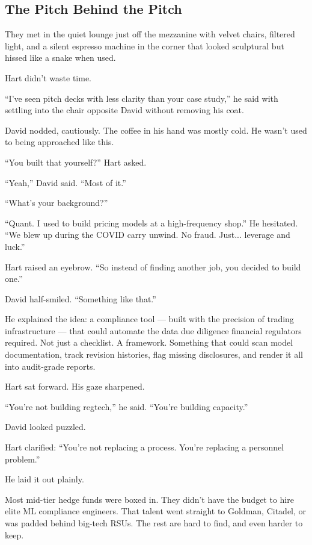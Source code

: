 
\subsection{The Pitch Behind the Pitch}

They met in the quiet lounge just off the mezzanine with
velvet chairs, filtered light, and a silent espresso machine in the corner that looked sculptural but hissed like a 
snake when used. 

Hart didn’t waste time.

``I’ve seen pitch decks with less clarity than your case study,'' he said with settling into the chair opposite David 
without removing his coat.

David nodded, cautiously. The coffee in his hand was mostly cold. He wasn’t used to being approached like this.

``You built that yourself?'' Hart asked.

``Yeah,'' David said. ``Most of it.''

``What’s your background?''

``Quant. I used to build pricing models at a high-frequency shop.'' 
He hesitated. ``We blew up during the COVID carry unwind. No fraud. Just... leverage and luck.''

Hart raised an eyebrow. ``So instead of finding another job, you decided to build one.''

David half-smiled. ``Something like that.''

He explained the idea: a compliance tool --- built with the precision of trading infrastructure --- that could 
automate the data due diligence financial regulators required.  
Not just a checklist. A framework. Something that could scan model documentation, track revision histories, flag 
missing disclosures, and render it all into audit-grade reports.

Hart sat forward. His gaze sharpened.

``You’re not building regtech,'' he said. ``You’re building capacity.''

David looked puzzled.

Hart clarified: ``You’re not replacing a process. You’re replacing a personnel problem.''

He laid it out plainly. 

Most mid-tier hedge funds were boxed in. They didn’t have the budget to hire elite ML compliance engineers. 
That talent went straight to Goldman, Citadel, or was padded behind big-tech RSUs. 
The rest are hard to find, and even harder to keep.

